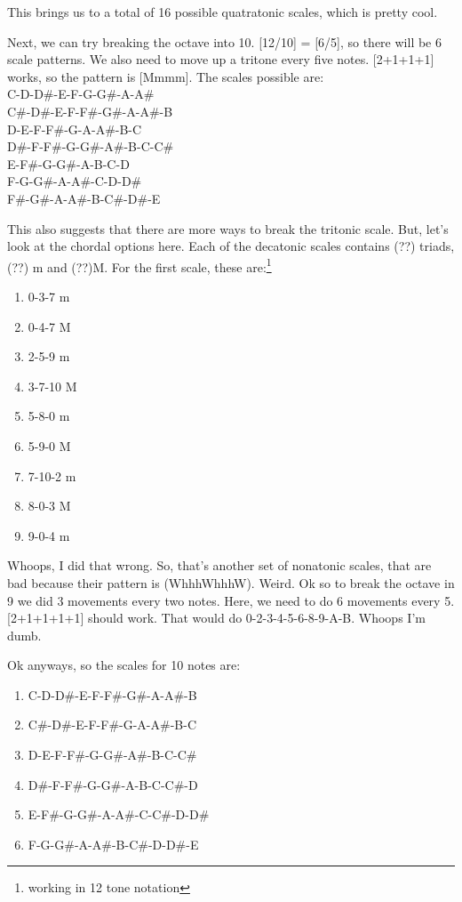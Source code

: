 \documentclass[12pt]{article}[titlepage]
\newcommand{\1}{\={a}}
\newcommand{\2}{\={e}}
\newcommand{\3}{\={\i}}
\newcommand{\4}{\=o}
\newcommand{\5}{\=u}
\newcommand{\6}{\={A}}
\renewcommand{\,}{\textsuperscript{,}}
\begin{document}
This brings us to a total of 16 possible quatratonic scales, which is pretty cool.

Next, we can try breaking the octave into 10.
[12/10] = [6/5], so there will be 6 scale patterns.
We also need to move up a tritone every five notes.
[2+1+1+1] works, so the pattern is [Mmmm].
The scales possible are:\\
C-D-D\#-E-F-G-G\#-A-A\#\\
C\#-D\#-E-F-F\#-G\#-A-A\#-B\\
D-E-F-F\#-G-A-A\#-B-C\\
D\#-F-F\#-G-G\#-A\#-B-C-C\#\\
E-F\#-G-G\#-A-B-C-D\\
F-G-G\#-A-A\#-C-D-D\#\\
F\#-G\#-A-A\#-B-C\#-D\#-E

This also suggests that there are more ways to break the tritonic scale.
But, let's look at the chordal options here.
Each of the decatonic scales contains (??) triads, (??) m and (??)M.
For the first scale, these are:\footnote{working in 12 tone notation}
\begin{enumerate}
\item 0-3-7 m
\item 0-4-7 M
\item 2-5-9 m
\item 3-7-10 M
\item 5-8-0 m
\item 5-9-0 M
\item 7-10-2 m
\item 8-0-3 M
\item 9-0-4 m
\end{enumerate}

Whoops, I did that wrong.
So, that's another set of nonatonic scales, that are bad because their pattern is  (WhhhWhhhW).
Weird.
Ok so to break the octave in 9 we did 3 movements every two notes.
Here, we need to do 6 movements every 5.
[2+1+1+1+1] should work.
That would do 0-2-3-4-5-6-8-9-A-B.
Whoops I'm dumb.

Ok anyways, so the scales for 10 notes are:
\begin{enumerate}
\item C-D-D\#-E-F-F\#-G\#-A-A\#-B
\item C\#-D\#-E-F-F\#-G-A-A\#-B-C
\item D-E-F-F\#-G-G\#-A\#-B-C-C\#
\item D\#-F-F\#-G-G\#-A-B-C-C\#-D
\item E-F\#-G-G\#-A-A\#-C-C\#-D-D\#
\item F-G-G\#-A-A\#-B-C\#-D-D\#-E
\end{enumerate}
\end{document}
